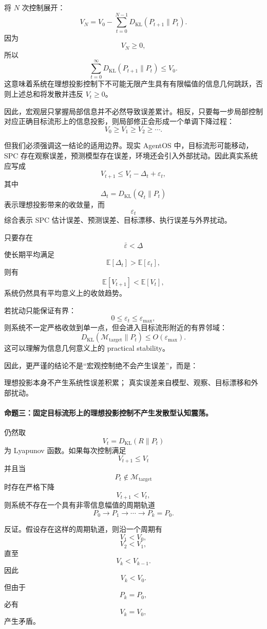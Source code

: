 将 $N$ 次控制展开：
\[
V_N
=
V_0
-
\sum_{t=0}^{N-1}
D_{\mathrm{KL}}
\left(
P_{t+1}\|P_t
\right).
\]
因为
\[
V_N\ge0,
\]
所以
\[
\sum_{t=0}^{\infty}
D_{\mathrm{KL}}
\left(
P_{t+1}\|P_t
\right)
\le
V_0.
\]
这意味着系统在理想投影控制下不可能无限产生具有有限幅值的信息几何跳跃，否则上述总和将发散并违反 $V_t\ge0$。

因此，宏观层只掌握局部信息并不必然导致误差累计。相反，只要每一步局部控制对应正确目标流形上的信息投影，则局部修正会形成一个单调下降过程：
\[
\boxed{
V_0
\ge
V_1
\ge
V_2
\ge
\cdots.
}
\]

但我们必须强调这一结论的适用边界。现实 AgentOS 中，目标流形可能移动，SPC 存在观察误差，预测模型存在误差，环境还会引入外部扰动。因此真实系统应写成
\[
V_{t+1}
\le
V_t
-
\Delta_t
+
\varepsilon_t,
\label{eq:perturbed-information-geometric-control}
\]
其中
\[
\Delta_t
=
D_{\mathrm{KL}}
\left(
Q_t\|P_t
\right)
\]
表示理想投影带来的收敛量，而
\[
\varepsilon_t
\]
综合表示 SPC 估计误差、预测误差、目标漂移、执行误差与外界扰动。

只要存在
\[
\bar\varepsilon
<
\underline\Delta
\]
使长期平均满足
\[
\mathbb{E}[\Delta_t]
>
\mathbb{E}[\varepsilon_t],
\]
则有
\[
\mathbb{E}[V_{t+1}]
<
\mathbb{E}[V_t],
\]
系统仍然具有平均意义上的收敛趋势。

若扰动只能保证有界：
\[
0\le\varepsilon_t\le\varepsilon_{\max},
\]
则系统不一定严格收敛到单一点，但会进入目标流形附近的有界邻域：
\[
D_{\mathrm{KL}}
\left(
\mathcal{M}_{\mathrm{target}}\|P_t
\right)
\le
O(\varepsilon_{\max}).
\]
这可以理解为信息几何意义上的 practical stability。

因此，更严谨的结论不是``宏观控制绝不会产生误差''，而是：
\begin{conclusion}
理想投影本身不产生系统性误差积累；
真实误差来自模型、观察、目标漂移和外部扰动。
\end{conclusion}

\paragraph{命题三：固定目标流形上的理想投影控制不产生发散型认知震荡。}

仍然取
\[
V_t
=
D_{\mathrm{KL}}(R\|P_t)
\]
为 Lyapunov 函数。如果每次控制满足
\[
V_{t+1}\le V_t
\]
并且当
\[
P_t\notin\mathcal{M}_{\mathrm{target}}
\]
时存在严格下降
\[
V_{t+1}<V_t,
\]
则系统不存在一个具有非零信息幅值的周期轨道
\[
P_0
\rightarrow
P_1
\rightarrow
\cdots
\rightarrow
P_k
=
P_0.
\]

反证。假设存在这样的周期轨道，则沿一个周期有
\[
V_1<V_0,
\]
\[
V_2<V_1,
\]
直至
\[
V_k<V_{k-1}.
\]
因此
\[
V_k<V_0.
\]
但由于
\[
P_k=P_0,
\]
必有
\[
V_k=V_0,
\]
产生矛盾。

